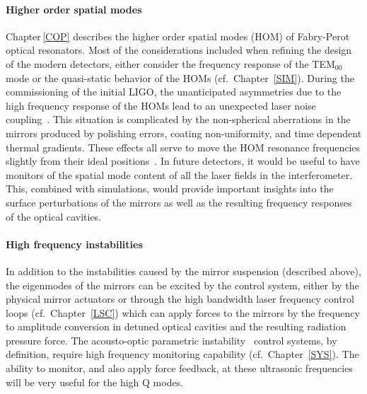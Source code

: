 \paragraph{Higher order spatial modes}
Chapter\,\ref{COP} describes the higher order spatial modes (HOM) of
    Fabry-Perot optical resonators. Most of the considerations included when
    refining the design of the modern detectors, either consider the frequency
    response of the TEM$_{00}$ mode or the quasi-static behavior of the
    HOMs (cf.~Chapter~\ref{SIM}). During the commissioning
    of the initial LIGO, the unanticipated asymmetries due to the high frequency
    response of the HOMs lead to an unexpected laser noise coupling~\cite{Stefan:Thesis}.
    This situation is complicated by the non-spherical aberrations in the mirrors
    produced by polishing errors, coating non-uniformity, and time dependent
    thermal gradients. These effects all serve to move the HOM resonance frequencies
    slightly from their ideal positions~\cite{Siegman:Lasers}. In
    future detectors, it would be useful to have monitors of the
    spatial mode content of all the laser fields in the
    interferometer. This, combined with simulations, would provide
    important insights into the surface perturbations of the mirrors
    as well as the resulting frequency responses of the optical cavities.

\paragraph{High frequency instabilities}
In addition to the instabilities caused by the mirror
    suspension (described above), the eigenmodes of the mirrors can be
    excited by the control system, either by the physical mirror actuators
    or through the high bandwidth laser frequency control loops
    (cf.~Chapter~\ref{LSC}) which can apply forces to the mirrors by the
    frequency to amplitude conversion in detuned optical cavities and the
    resulting radiation pressure force. The acousto-optic parametric
    instability~\cite{Matt:PI} control systems, by definition, require
    high frequency monitoring capability (cf.~Chapter~\ref{SYS}). The
    ability to monitor, and also apply force feedback, at these
    ultrasonic frequencies will be very useful for the high Q modes.


